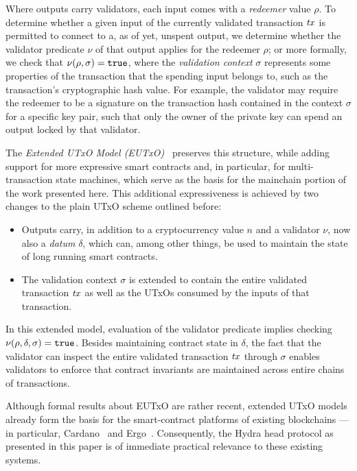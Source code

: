 Where outputs carry validators, each input comes with a \emph{redeemer} value $\rho$. To determine whether a given input of the currently validated transaction $\mathit{tx}$ is permitted to connect to a, as of yet, unspent output, we determine whether the validator predicate $\nu$ of that output applies for the redeemer $\rho$; or more formally, we check that \(\nu(\rho, \sigma) = \mathtt{true}\), where the \emph{validation context} $\sigma$ represents some properties of the transaction that the spending input belongs to, such as the transaction's cryptographic hash value. For example, the validator may require the redeemer to be a signature on the transaction hash contained in the context $\sigma$ for a specific key pair, such that only the owner of the private key can spend an output locked by that validator.

The \emph{Extended UTxO Model (EUTxO)}~\cite{eutxo} preserves this
structure, while adding support for more expressive smart contracts
and, in particular, for multi-transaction state machines, which serve
as the basis for the mainchain portion of the work presented
here. This additional expressiveness is achieved by two changes to the plain UTxO scheme outlined before: 
%
\begin{itemize}
\item Outputs carry, in addition to a cryptocurrency value $n$ and a validator $\nu$, now also a \emph{datum} $\delta$, which can, among other things, be used to maintain the state of long running smart contracts.
\item The validation context $\sigma$ is extended to contain the entire validated transaction $\mathit{tx}$ as well as the UTxOs consumed by the inputs of that transaction.
\end{itemize}
%
In this extended model, evaluation of the validator predicate implies checking \(\nu(\rho, \delta, \sigma) = \mathtt{true}\). Besides maintaining contract state in $\delta$, the fact that the validator can inspect the entire validated transaction $\mathit{tx}$ through $\sigma$ enables validators to enforce that contract invariants are maintained across entire chains of transactions.

Although formal results about EUTxO are rather recent, extended UTxO models already form the basis for the smart-contract platforms of existing blockchains --- in particular, Cardano~\cite{plutus-platform} and Ergo~\cite{ergo-platform}. Consequently, the Hydra head protocol as presented in this paper is of immediate practical relevance to these existing systems.

